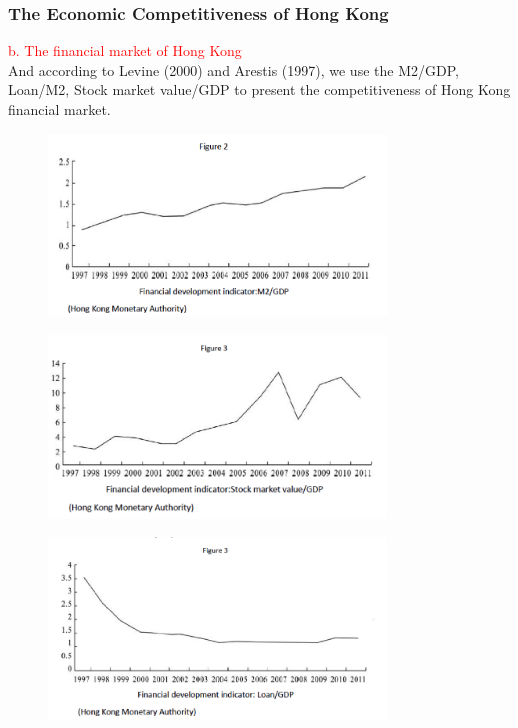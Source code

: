 \documentclass[slidestop,uncompress,mathsans, 12pt]{beamer}
\begin{document}
\begin{frame}
\frametitle{The Economic Competitiveness of Hong Kong}%
\textcolor{red}{b. The financial market of Hong Kong}\\
And according to Levine (2000) and Arestis (1997), we use the M2/GDP, Loan/M2, Stock market value/GDP to present the competitiveness of Hong Kong financial market.\\
\begin{overprint}
\begin{figure}[h]
\centering
\includegraphics[width=0.8\textwidth]{hk10.png}
\label{threadsVsSync}
\end{figure}
\begin{figure}[h]
\centering
\includegraphics[width=0.8\textwidth]{hk11.png}
\label{threadsVsSync}
\end{figure}
\begin{figure}[h]
\centering
\includegraphics[width=0.8\textwidth]{hk12.png}
\label{threadsVsSync}
\end{figure}
\end{overprint}
\end{frame}
\end{document}
